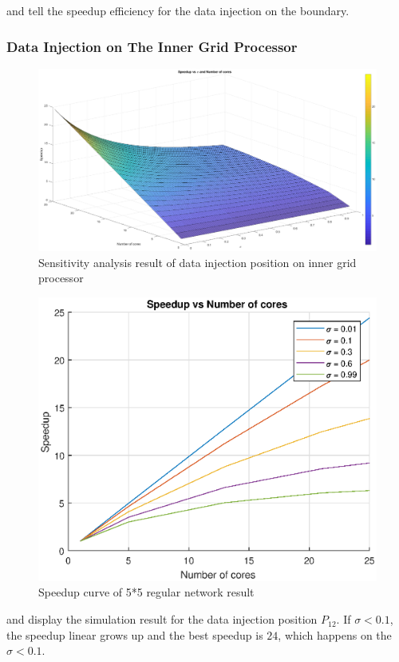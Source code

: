  and  tell the speedup efficiency for the data injection on the boundary.  

\newpage 
\subsubsection{Data Injection on The Inner Grid Processor}

\begin{figure}[!ht]
\centering
\includegraphics[width=1\columnwidth]{figure/sa5t5i_no.eps}
\caption{Sensitivity analysis result of data injection position on inner grid processor}
\label{fig:sa5t5i_no}
\end{figure}

\begin{figure}[!ht]
\centering
\includegraphics[width=1\columnwidth]{figure/sa5t5i_no_curve.eps}
\caption{Speedup curve of 5*5 regular network result}
\label{fig:sa5t5i_no_curve}
\end{figure}

 and  display the simulation result for the data injection position $P_{12}$.   If $\sigma < 0.1$, the speedup linear grows up and the best speedup is $24$, which happens on the $\sigma < 0.1$.   

\newpage
